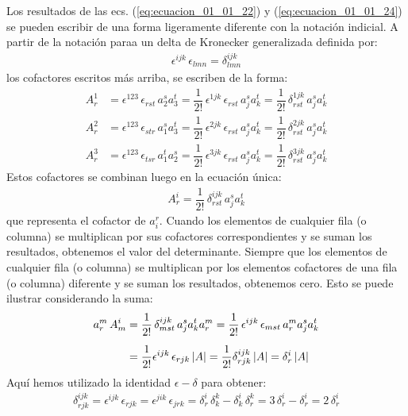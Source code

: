 \documentclass[hidelinks,12pt]{article}
\begin{document}
Los resultados de las ecs. (\ref{eq:ecuacion_01_01_22}) y (\ref{eq:ecuacion_01_01_24}) se pueden escribir de una forma ligeramente diferente con la notación indicial. A partir de la notación paraa un delta de Kronecker generalizada definida por:
\begin{align*}
\epsilon^{ijk} \, \epsilon_{lmn} = \delta_{lmn}^{ijk}
\end{align*}
los cofactores escritos más arriba, se escriben de la forma:
\begin{align*}
A_{r}^{1} &= \epsilon^{123} \, \epsilon_{rst} \, a_{2}^{s} a_{3}^{t} = \dfrac{1}{2!} \, \epsilon^{1jk} \, \epsilon_{rst} \, a_{j}^{s} a_{k}^{t} = \dfrac{1}{2!} \, \delta_{rst}^{1jk} \, a_{j}^{s} a_{k}^{t} \\[0.5em]
A_{r}^{2} &= \epsilon^{123} \, \epsilon_{str} \, a_{1}^{s} a_{3}^{t} = \dfrac{1}{2!} \, \epsilon^{2jk} \, \epsilon_{rst} \, a_{j}^{s} a_{k}^{t} = \dfrac{1}{2!} \, \delta_{rst}^{2jk} \, a_{j}^{s} a_{k}^{t} \\[0.5em]
A_{r}^{3} &= \epsilon^{123} \, \epsilon_{tsr} \, a_{1}^{t} a_{2}^{s} = \dfrac{1}{2!} \, \epsilon^{3jk} \, \epsilon_{rst} \, a_{j}^{s} a_{k}^{t} = \dfrac{1}{2!} \, \delta_{rst}^{3jk} \, a_{j}^{s} a_{k}^{t}
\end{align*}
Estos cofactores se combinan luego en la ecuación única:
\begin{align}
A_{r}^{i} = \dfrac{1}{2!} \, \delta_{rst}^{ijk} \, a_{j}^{s} a_{k}^{t}
\label{eq:ecuacion_01_01_25}
\end{align}
que representa el cofactor de $a_{i}^{r}$. Cuando los elementos de cualquier fila (o columna) se multiplican por sus cofactores correspondientes y se suman los resultados, obtenemos el valor del determinante. Siempre que los elementos de cualquier fila (o columna) se multiplican por los elementos cofactores de una fila (o columna) diferente y se suman los resultados, obtenemos cero. Esto se puede ilustrar considerando la suma:
\begin{align*}
a_{r}^{m} \, A_{m}^{i} &= \dfrac{1}{2!} \, \delta_{mst}^{ijk} \, a_{j}^{s} a_{k}^{t} a_{r}^{m} = \dfrac{1}{2!} \, \epsilon^{ijk} \, \epsilon_{mst} \, a_{r}^{m} a_{j}^{s} a_{k}^{t} \\[0.5em]
&= \dfrac{1}{2!} \epsilon^{ijk} \, \epsilon_{rjk} \, \abs{A} = \dfrac{1}{2!} \delta_{rjk}^{ijk} \, \abs{A} = \delta_{r}^{i} \, \abs{A}
\end{align*}
Aquí hemos utilizado la identidad $\epsilon - \delta$ para obtener:
\begin{align*}
\delta_{rjk}^{ijk} = \epsilon^{ijk} \, \epsilon_{rjk} = \epsilon^{jik} \, \epsilon_{jrk} = \delta_{r}^{i} \, \delta_{k}^{k} - \delta_{k}^{i} \, \delta_{r}^{k} = 3 \, \delta_{r}^{i} - \delta_{r}^{i} = 2 \, \delta_{r}^{i}
\end{align*}
\end{document}
